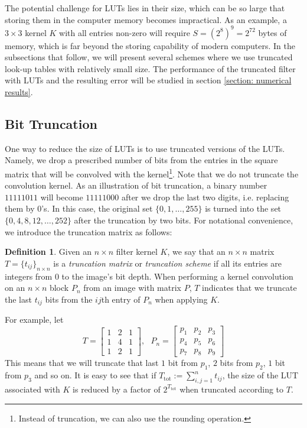 \documentclass[12pt]{amsart}
\theoremstyle{definition}
\newtheorem{defn}[thm]{Definition}
\theoremstyle{remark}
\numberwithin{thm}{section}
\begin{document}
The potential challenge for LUTs lies in their size, which can be so large that storing them in the computer memory becomes impractical. As an example, a $3\times 3$ kernel $K$ with all entries non-zero will require $S=(2^8)^9=2^{72}$ bytes of memory, which is far beyond the storing capability of modern computers. In the subsections that follow, we will present several schemes where we use truncated look-up tables with relatively small size. The performance of the truncated filter with LUTs and the resulting error will be studied in section \ref{section: numerical results}. 

\subsection{Bit Truncation}\label{subsection:bit_truncation}
One way to reduce the size of LUTs is to use truncated versions of the LUTs. Namely, we drop a prescribed number of bits from the entries in the square matrix that will be convolved with the kernel\footnote{Instead of truncation, we can also use the rounding operation.}. Note that we do not truncate the convolution kernel. As an illustration of bit truncation, a binary number $11111011$ will become $11111000$ after we drop the last two digits, i.e. replacing them by $0$'s. In this case, the original set $\{0,1,\dots,255\}$ is turned into the set $\{0,4,8,12,\dots,252\}$ after the truncation by two bits. For notational convenience, we introduce the truncation matrix as follows:

\begin{defn}\label{defn:truncation_matrix}
Given an $n\times n$ filter kernel $K$, we say that an $n\times n$ matrix $T= \{t_{ij}\}_{n\times n}$ is a \emph{truncation matrix} or \emph{truncation scheme} if all its entries are integers from 0 to the image's bit depth. When performing a kernel convolution on an $n\times n$ block $P_n$ from an image with matrix $P$, $T$ indicates that we truncate the last $t_{ij}$ bits from the $ij$th entry of $P_n$ when applying $K$. 
\end{defn}

For example, let
$$
T=
\begin{bmatrix}
1 & 2& 1\\
1 & 4 & 1\\
1 & 2 &1
\end{bmatrix}, \ \ \ 
P_n=
\begin{bmatrix}
p_1 & p_2& p_3\\
p_4 & p_5 & p_6\\
p_7 & p_8 &p_9
\end{bmatrix}
$$
This means that we will truncate that last $1$ bit from $p_1$, $2$ bits from $p_2$, $1$ bit from $p_3$ and so on. It is easy to see that if $T_\text{tot} := \sum_{i,j=1}^nt_{ij}$, the size of the LUT associated with $K$ is reduced by a factor of $2^{T_\text{tot}}$ when truncated according to $T$.
\end{document}
